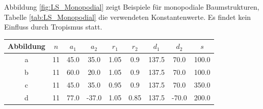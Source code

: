 Abbildung \ref{fig:LS_Monopodial} zeigt Beispiele für monopodiale Baumstrukturen, Tabelle \ref{tab:LS_Monopodial} die verwendeten Konstantenwerte. Es findet kein Einfluss durch Tropismus statt.
\begin{center}
	\begin{tabulary}{\textwidth}{|C|C|C|C|C|C|C|C|C|}
		\hline 
		Abbildung & $n$ & $a_1$ & $a_2$ & $r_1$ & $r_2$ & $d_1$ & $d_2$ & $s$ \\ 
		\hline 
		a & 11 & 45.0 & 35.0 & 1.05 & 0.9 & 137.5 & 70.0 & 100.0 \\ 
		\hline 
		b & 11 & 60.0 & 20.0 & 1.05 & 0.9 & 137.5 & 70.0 & 100.0 \\ 
		\hline 
		c & 11 & 45.0 & 35.0 & 0.95 & 0.9 & 137.5 & 70.0 & 350.0 \\ 
		\hline 
		d & 11 & 77.0 & -37.0 & 1.05 & 0.85 & 137.5 & -70.0 & 200.0 \\ 
		\hline 
	\end{tabulary} 
	\label{tab:LS_Monopodial}
\end{center}


